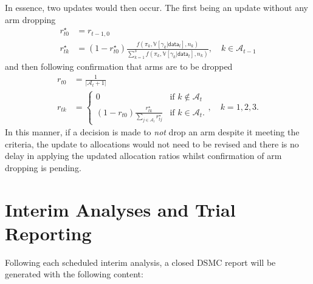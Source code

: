 \documentclass[11pt,parskip=half-]{scrartcl}
\begin{document}
In essence, two updates would then occur. The first being an update without any arm dropping
$$
  \begin{aligned}
    r_{t0}^\star & = r_{t-1,0}                                                                                                                                                                 \\
    r_{tk}^\star & = (1 - r_{t0}^\star)\frac{f(\pi_k, \mathbb V[\gamma_k|\mathsf{data}_t], n_k)}{\sum_{k=1}^3 f(\pi_k, \mathbb V[\gamma_k|\mathsf{data}_t], n_k)}, \quad k\in\mathcal{A}_{t-1}
  \end{aligned}
$$
and then following confirmation that arms are to be dropped
$$
  \begin{aligned}
    r_{t0} & = \frac{1}{|\mathcal{A}_t + 1|}               \\
    r_{tk} & = \begin{cases}
      0                                                                       & \text{if } k \notin \mathcal{A}_t \\
      (1 - r_{t0}) \frac{r_{tk}^\star}{\sum_{j\in\mathcal{A}_t} r_{tj}^\star} & \text{if } k \in \mathcal{A}_t.
    \end{cases}, \quad k=1,2,3.
  \end{aligned}
$$
In this manner, if a decision is made to \emph{not} drop an arm despite it meeting the criteria, the update to allocations would not need to be revised and there is no delay in applying the updated allocation ratios whilst confirmation of arm dropping is pending.

\clearpage

\section{Interim Analyses and Trial Reporting}\label{interim-analyses-and-trial-reporting}

Following each scheduled interim analysis, a closed DSMC report will be generated with the following content:
\end{document}

